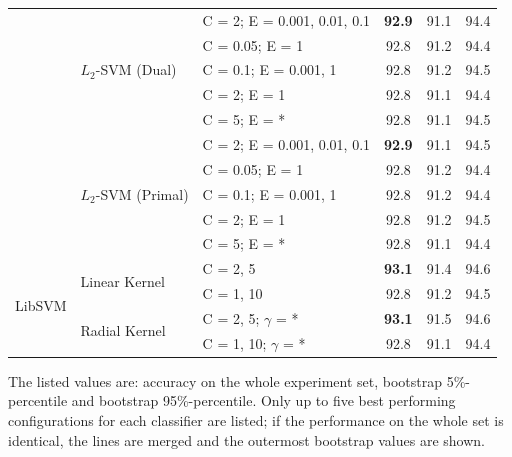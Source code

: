 \documentclass[12pt,notitlepage]{report}
\begin{document}
\begin{table}[htbp]
\begin{center}
\begin{tabular}{|l|l|l|c|c|c|}
 & \multirow{5}{*}{$L_2$-SVM (Dual)} & C = 2; E = 0.001, 0.01, 0.1 & \bf 92.9 & 91.1 & 94.4 \\
 &  & C = 0.05; E = 1 & 92.8 & 91.2 & 94.4 \\
 &  & C = 0.1; E = 0.001, 1 & 92.8 & 91.2 & 94.5 \\
 &  & C = 2; E = 1 & 92.8 & 91.1 & 94.4 \\
 & & C = 5; E = * & 92.8 & 91.1 & 94.5 \\\cline{2-6}
 & \multirow{5}{*}{$L_2$-SVM (Primal)} & C = 2; E = 0.001, 0.01, 0.1 & \bf 92.9 & 91.1 & 94.5 \\
 &  & C = 0.05; E = 1 & 92.8 & 91.2 & 94.4 \\
 &  & C = 0.1; E = 0.001, 1 & 92.8 & 91.2 & 94.4 \\
 &  & C = 2; E = 1 & 92.8 & 91.2 & 94.5 \\
 &  & C = 5; E = * & 92.8 & 91.1 & 94.4 \\\hline
 \multirow{4}{*}{LibSVM} & \multirow{2}{*}{Linear Kernel} & C = 2, 5 & \bf 93.1 & 91.4 & 94.6 \\
 &  & C = 1, 10 & 92.8 & 91.2 & 94.5 \\\cline{2-6}
 & \multirow{2}{*}{Radial Kernel} & C = 2, 5; $\gamma$ = * & \bf 93.1 & 91.5 & 94.6 \\
 &  & C = 1, 10; $\gamma$ = * & 92.8 & 91.1 & 94.4 \\\hline
\end{tabular}
\end{center}
The listed values are: accuracy on the whole experiment set, bootstrap 5\%-percentile and bootstrap 95\%-percentile. Only up to five best performing configurations for each classifier are listed; if the performance on the whole set is identical, the lines are merged and the outermost bootstrap values are shown.
\end{table}
\end{document}

